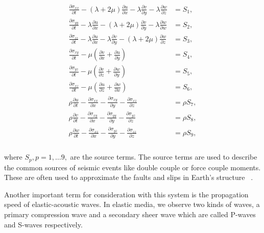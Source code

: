 \begin{align}
    \begin{split}
    \frac{\partial \sigma_{xx}}{\partial t} - \left(\lambda  + 2\mu\right)\frac{\partial u}{\partial x} - \lambda \frac{\partial v}{\partial y} - \lambda\frac{\partial w}{\partial z} &= S_1, \\    
    \frac{\partial \sigma_{yy}}{\partial t} - \lambda \frac{\partial u}{\partial x} - \left( \lambda + 2 \mu \right)\frac{\partial v}{\partial y} - \lambda \frac{\partial w}{\partial w} &= S_2, \\
    \frac{\partial \sigma_{zz}}{\partial t} - \lambda \frac{\partial u}{\partial x} - \lambda \frac{\partial v}{\partial y} - \left(\lambda + 2\mu\right)\frac{\partial w}{\partial z} &= S_3, \\
    \frac{\partial \sigma_{xy}}{\partial t} - \mu \left(\frac{\partial v}{\partial x} + \frac{\partial u}{\partial y}\right) &= S_4, \\ 
    \frac{\partial \sigma_{yz}}{\partial t} - \mu \left(\frac{\partial v}{\partial z} + \frac{\partial w}{\partial y}\right) &= S_5, \\
    \frac{\partial \sigma_{xz}}{\partial t} - \mu \left(\frac{\partial u}{\partial z} + \frac{\partial w}{\partial x}\right) &= S_6, \\
    \rho \frac{\partial u}{\partial t} - \frac{\partial \sigma_{xx}}{\partial x} - \frac{\partial \sigma_{xy}}{\partial y} - \frac{\partial \sigma_{xz}}{\partial z} &= \rho S_7, \\
    \rho \frac{\partial v}{\partial t} - \frac{\partial \sigma_{xy}}{\partial x} - \frac{\partial \sigma_{yy}}{\partial y} - \frac{\partial \sigma_{yz}}{\partial z} &= \rho S_8, \\
    \rho \frac{\partial w}{\partial t} - \frac{\partial \sigma_{xz}}{\partial x} - \frac{\partial \sigma_{yz}}{\partial y} - \frac{\partial \sigma_{zz}}{\partial z} &= \rho S_9, \\
\end{split}
\label{eq:setofequations}
\end{align}

where $S_p, p = 1,\dots9,$ are the source terms. The source terms are used to describe the common sources of seismic events like double couple or force couple moments.
These are often used to approximate the faults and slips in Earth's structure ~\parencite{shearer_2019}.

Another important term for consideration with this system is the propagation speed of elastic-acoustic waves. In elastic media, we 
observe two kinds of waves, a primary compression wave and a secondary sheer wave which are called P-waves and S-waves respectively.

